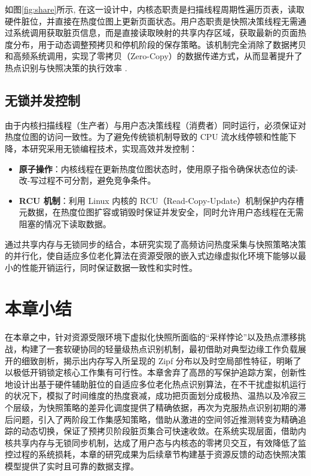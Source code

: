 如图\ref{fig:share}所示, 在这一设计中，内核态职责是扫描线程周期性遍历页表，读取硬件脏位，并直接在热度位图上更新页面状态。用户态职责是快照决策线程无需通过系统调用获取脏页信息，而是直接读取映射的共享内存区域，获取最新的页面热度分布，用于动态调整预拷贝和停机阶段的保存策略。该机制完全消除了数据拷贝和高频系统调用，实现了零拷贝（Zero-Copy）的数据传递方式，从而显著提升了热点识别与快照决策的执行效率 \cite{xu2015vmexit}.

\subsection{无锁并发控制}

由于内核扫描线程（生产者）与用户态决策线程（消费者）同时运行，必须保证对热度位图的访问一致性。为了避免传统锁机制导致的 CPU 流水线停顿和性能下降，本研究采用无锁编程技术，实现高效并发控制：

\begin{itemize}
    \item \textbf{原子操作}：内核线程在更新热度位图状态时，使用原子指令确保状态位的读-改-写过程不可分割，避免竞争条件。
    \item \textbf{RCU 机制}：利用 Linux 内核的 RCU（Read-Copy-Update）机制保护内存槽元数据，在热度位图扩容或销毁时保证并发安全，同时允许用户态线程在无需阻塞的情况下读取数据。
\end{itemize}

通过共享内存与无锁同步的结合，本研究实现了高频访问热度采集与快照策略决策的并行化，使自适应多位老化算法在资源受限的嵌入式边缘虚拟化环境下能够以最小的性能开销运行，同时保证数据一致性和实时性。

\section{本章小结}

在本章之中，针对资源受限环境下虚拟化快照所面临的“采样悖论”以及热点漂移挑战，构建了一套软硬协同的轻量级热点识别机制，最初借助对典型边缘工作负载展开的细致剖析，揭示出内存写入所呈现的 Zipf 分布以及时空局部性特征，明晰了以极低开销锁定核心工作集有可行性。本章舍弃了高昂的写保护追踪方案，创新性地设计出基于硬件辅助脏位的自适应多位老化热点识别算法，在不干扰虚拟机运行的状况下，模拟了时间维度的热度衰减，成功把页面划分成极热、温热以及冷寂三个层级，为快照策略的差异化调度提供了精确依据，再次为克服热点识别初期的滞后问题，引入了两阶段工作集感知策略，借助从激进的空间邻近推测转变为精确追踪的动态切换，保证了预拷贝阶段脏页集合可快速收敛。在系统实现层面，借助内核共享内存与无锁同步机制，达成了用户态与内核态的零拷贝交互，有效降低了监控过程的系统损耗，本章的研究成果为后续章节构建基于资源反馈的动态快照决策模型提供了实时且可靠的数据支撑。

